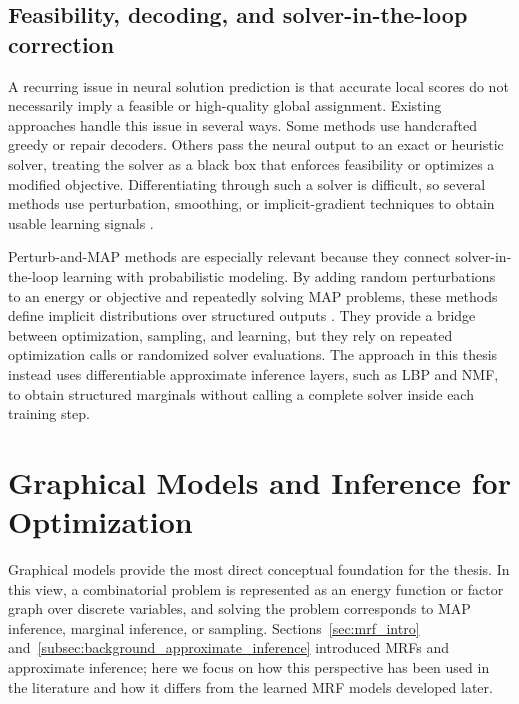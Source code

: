 \subsection{Feasibility, decoding, and solver-in-the-loop correction}
\label{subsec:rw_decoding_and_correction}

A recurring issue in neural solution prediction is that accurate local scores do not necessarily imply a feasible or high-quality global assignment. Existing approaches handle this issue in several ways. Some methods use handcrafted greedy or repair decoders. Others pass the neural output to an exact or heuristic solver, treating the solver as a black box that enforces feasibility or optimizes a modified objective. Differentiating through such a solver is difficult, so several methods use perturbation, smoothing, or implicit-gradient techniques to obtain usable learning signals \cite{berthet_learning_2020,vlastelica_differentiation_2019,blondel_efficient_2021}.

Perturb-and-MAP methods are especially relevant because they connect solver-in-the-loop learning with probabilistic modeling. By adding random perturbations to an energy or objective and repeatedly solving MAP problems, these methods define implicit distributions over structured outputs \cite{papandreou_perturb-and-map_2011,nowozin_perturb-and-map_2014,bertasius_local_2017,tarlow_randomized_2012}. They provide a bridge between optimization, sampling, and learning, but they rely on repeated optimization calls or randomized solver evaluations. The approach in this thesis instead uses differentiable approximate inference layers, such as LBP and NMF, to obtain structured marginals without calling a complete solver inside each training step.

\section{Graphical Models and Inference for Optimization}
\label{sec:rw_graphical_models}

Graphical models provide the most direct conceptual foundation for the thesis. In this view, a combinatorial problem is represented as an energy function or factor graph over discrete variables, and solving the problem corresponds to MAP inference, marginal inference, or sampling. Sections~\ref{sec:mrf_intro} and~\ref{subsec:background_approximate_inference} introduced MRFs and approximate inference; here we focus on how this perspective has been used in the literature and how it differs from the learned MRF models developed later.

